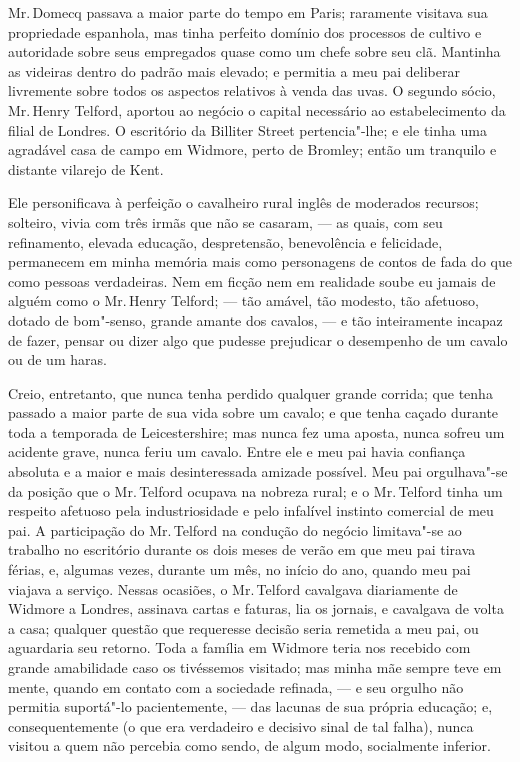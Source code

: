 {{{{{{{{{{{{%
Mr.\,Domecq passava a maior parte do tempo em Paris; raramente
visitava sua propriedade espanhola, mas tinha perfeito domínio dos
processos de cultivo e autoridade sobre seus empregados quase como um
chefe sobre seu clã. Mantinha as videiras dentro do padrão mais elevado;
e permitia a meu pai deliberar livremente sobre todos os aspectos
relativos à venda das uvas. O segundo sócio, Mr.\,Henry Telford, aportou
ao negócio o capital necessário ao estabelecimento da filial de Londres.
O escritório da Billiter Street pertencia"-lhe; e ele tinha uma agradável
casa de campo em Widmore, perto de Bromley; então um tranquilo e
distante vilarejo de Kent.

Ele personificava à perfeição o cavalheiro rural inglês de moderados
recursos; solteiro, vivia com três irmãs que não se casaram, --- as
quais, com seu refinamento, elevada educação, despretensão, benevolência
e felicidade, permanecem em minha memória mais como personagens de
contos de fada do que como pessoas verdadeiras. Nem em ficção nem em
realidade soube eu jamais de alguém como o Mr.\,Henry Telford; --- tão
amável, tão modesto, tão afetuoso, dotado de bom"-senso, grande amante
dos cavalos, --- e tão inteiramente incapaz de fazer, pensar ou dizer
algo que pudesse prejudicar o desempenho de um cavalo ou de um haras.

Creio, entretanto, que nunca tenha perdido qualquer grande corrida;
que tenha passado a maior parte de sua vida sobre um cavalo; e que tenha
caçado durante toda a temporada de Leicestershire; mas nunca fez uma
aposta, nunca sofreu um acidente grave, nunca feriu um cavalo. Entre ele
e meu pai havia confiança absoluta e a maior e mais desinteressada
amizade possível. Meu pai orgulhava"-se da posição que o Mr.\,Telford
ocupava na nobreza rural; e o Mr.\,Telford tinha um respeito afetuoso pela
industriosidade e pelo infalível instinto comercial de meu pai. A
participação do Mr.\,Telford na condução do negócio limitava"-se ao
trabalho no escritório durante os dois meses de verão em que meu pai
tirava férias, e, algumas vezes, durante um mês, no início do ano,
quando meu pai viajava a serviço. Nessas ocasiões, o Mr.\,Telford
cavalgava diariamente de Widmore a Londres, assinava cartas e faturas,
lia os jornais, e cavalgava de volta a casa; qualquer questão que
requeresse decisão seria remetida a meu pai, ou aguardaria seu retorno.
Toda a família em Widmore teria nos recebido com grande amabilidade caso
os tivéssemos visitado; mas minha mãe sempre teve em mente, quando em
contato com a sociedade refinada, --- e seu orgulho não permitia
suportá"-lo pacientemente, --- das lacunas de sua própria educação; e,
consequentemente (o que era verdadeiro e decisivo sinal de tal falha),
nunca visitou a quem não percebia como sendo, de algum modo, socialmente
inferior.

}}}}}}}}}}}}
